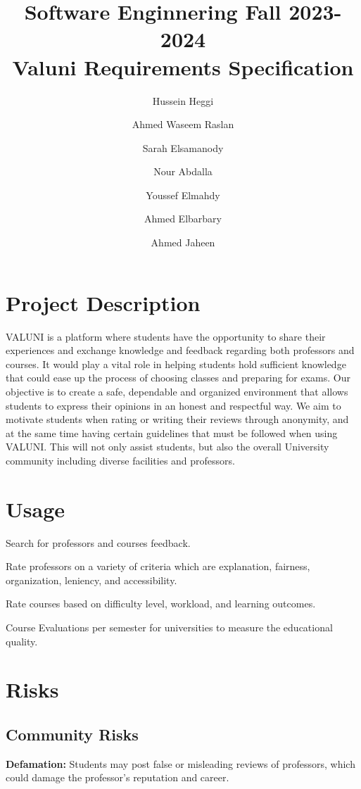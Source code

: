 \documentclass{article}
\title{Software Enginnering Fall 2023-2024 \\ Valuni Requirements Specification}
\author{  
Hussein Heggi 	\and
Ahmed Waseem Raslan 	\and
Sarah Elsamanody 	\and
Nour Abdalla 	\and
Youssef Elmahdy	\and
Ahmed Elbarbary	\and 
Ahmed Jaheen}
\begin{document}
\maketitle 

\break

\tableofcontents

\break

\section{Project Description}
\quad VALUNI is a platform where students have the opportunity to share their experiences and exchange knowledge and feedback regarding both professors and courses.  It would play a vital role in helping students hold sufficient knowledge that could ease up the process of choosing classes and preparing for exams. Our objective is to create a safe, dependable and organized environment that allows students to express their opinions in an honest and respectful way. We aim to motivate students when rating or writing their reviews through anonymity, and at the same time having certain guidelines that must be followed when using VALUNI. This will not only assist students, but also the overall University community including diverse facilities and professors. 

\section{Usage}
Search for professors and courses feedback.  

Rate professors on a variety of criteria which are explanation, fairness, organization, leniency, and accessibility.

Rate courses based on difficulty level, workload, and learning outcomes.

Course Evaluations per semester for universities to measure the educational quality.

\section{Risks} 

\subsection{Community Risks}
\textbf{Defamation:} Students may post false or misleading reviews of professors, which could damage the professor's reputation and career.
\end{document}
